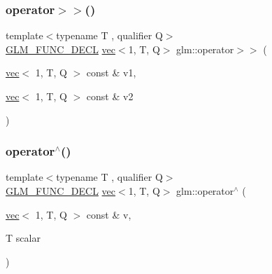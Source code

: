 \subsubsection{\texorpdfstring{operator$>$$>$()}{operator>>()}\hspace{0.1cm}{\footnotesize\ttfamily [3/3]}}
{\footnotesize\ttfamily template$<$typename T , qualifier Q$>$ \\
\mbox{\hyperlink{setup_8hpp_ab2d052de21a70539923e9bcbf6e83a51}{G\+L\+M\+\_\+\+F\+U\+N\+C\+\_\+\+D\+E\+CL}} \mbox{\hyperlink{structglm_1_1vec}{vec}}$<$1, T, Q$>$ glm\+::operator$>$$>$ (\begin{DoxyParamCaption}\item[{\mbox{\hyperlink{structglm_1_1vec}{vec}}$<$ 1, T, Q $>$ const \&}]{v1,  }\item[{\mbox{\hyperlink{structglm_1_1vec}{vec}}$<$ 1, T, Q $>$ const \&}]{v2 }\end{DoxyParamCaption})}

\mbox{\label{group__ext__vec1_ga5e3dabaa97accd1e6cf3853326605d3e}} 
\subsubsection{\texorpdfstring{operator$^\wedge$()}{operator^()}\hspace{0.1cm}{\footnotesize\ttfamily [1/3]}}
{\footnotesize\ttfamily template$<$typename T , qualifier Q$>$ \\
\mbox{\hyperlink{setup_8hpp_ab2d052de21a70539923e9bcbf6e83a51}{G\+L\+M\+\_\+\+F\+U\+N\+C\+\_\+\+D\+E\+CL}} \mbox{\hyperlink{structglm_1_1vec}{vec}}$<$1, T, Q$>$ glm\+::operator$^\wedge$ (\begin{DoxyParamCaption}\item[{\mbox{\hyperlink{structglm_1_1vec}{vec}}$<$ 1, T, Q $>$ const \&}]{v,  }\item[{T}]{scalar }\end{DoxyParamCaption})}

\mbox{\label{group__ext__vec1_gad8d8f5ba70c15af0a21dc1f79c2101b9}} 
